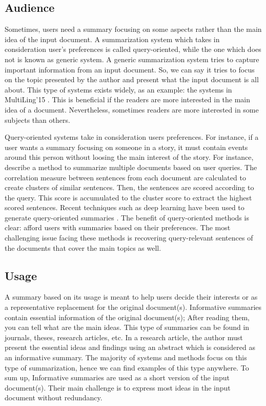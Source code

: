 \subsection{Audience}

Sometimes, users need a summary focusing on some aspects rather than the main idea of the input document. 
A summarization system which takes in consideration user's preferences is called query-oriented, while the one which does not is known as generic system. 
A generic summarization system tries to capture important information from an input document. 
So, we can say it tries to focus on the topic presented by the author and present what the input document is all about.
This type of systems exists widely, as an example: the systems in MultiLing'15 \citep{15-vanetik-litvak,15-aries-al,15-thomas-al,15-vicente-al}.
This is beneficial if the readers are more interested in the main idea of a document.
Nevertheless, sometimes readers are more interested in some subjects than others.

Query-oriented systems take in consideration users preferences.
For instance, if a user wants a summary focusing on someone in a story, it must contain events around this person without loosing the main interest of the story. 
For instance, \citet{10-bhaskar-bandyopadhyay} describe a method to summarize multiple documents based on user queries.
The correlation measure between sentences from each document are calculated to create clusters of similar sentences.
Then, the sentences are scored according to the query.
This score is accumulated to the cluster score to extract the highest scored sentences.
Recent techniques such as deep learning have been used to generate query-oriented summaries \citep{15-zhong-al,19-kimuru-al}.
The benefit of query-oriented methods is clear: afford users with summaries based on their preferences.
The most challenging issue facing these methods is recovering query-relevant sentences of the documents that cover the main topics as well.

\subsection{Usage}

A summary based on its usage is meant to help users decide their interests or as a representative replacement for the original document(s).
Informative summaries contain essential information of the original document(s); After reading them, you can tell what are the main ideas. 
This type of summaries can be found in journals, theses, research articles, etc. 
In a research article, the author must present the essential ideas and findings using an abstract which is considered as an informative summary.
The majority of systems and methods focus on this type of summarization, hence we can find examples of this type anywhere.
To sum up, Informative summaries are used as a short version of the input document(s).
Their main challenge is to express most ideas in the input document without redundancy.

